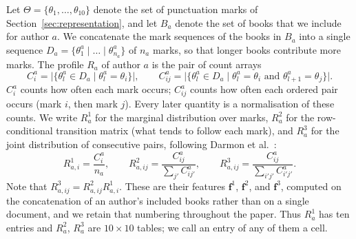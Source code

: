 \documentclass[11pt]{article}
\begin{document}
Let \(\Theta = \{\theta_1, \dots, \theta_{10}\}\) denote the set of
punctuation marks of Section~\ref{sec:representation}, and let \(B_a\)
denote the set of books that we include for author \(a\).  We concatenate
the mark sequences of the books in \(B_a\) into a single sequence
\(D_a = \{\theta^a_1 \mid \dots \mid \theta^a_{n_a}\}\) of \(n_a\) marks, so
that longer books contribute more marks.  The profile \(R_a\) of author
\(a\) is the pair of count arrays
\begin{equation}
  C^a_i = \big|\{\theta^a_l \in D_a \mid \theta^a_l = \theta_i\}\big|,
  \qquad
  C^a_{ij} = \big|\{\theta^a_l \in D_a \mid \theta^a_l = \theta_i
  \text{ and } \theta^a_{l+1} = \theta_j\}\big| .
  \label{eq:profile-counts}
\end{equation}
\(C^a_i\) counts how often each mark occurs; \(C^a_{ij}\) counts how often
each ordered pair occurs (mark \(i\), then mark \(j\)).  Every later
quantity is a normalisation of these counts.  We write \(R^1_a\) for the
marginal distribution over marks, \(R^2_a\) for the row-conditional
transition matrix (what tends to follow each mark), and \(R^3_a\) for the
joint distribution of consecutive pairs, following Darmon et al.\
\cite{darmon2021}:
\begin{equation}
  R^{1}_{a,i} = \frac{C^a_i}{n_a}, \qquad
  R^{2}_{a,ij} = \frac{C^a_{ij}}{\sum_{j'} C^a_{ij'}}, \qquad
  R^{3}_{a,ij} = \frac{C^a_{ij}}{\sum_{i'j'} C^a_{i'j'}} .
  \label{eq:profile-norms}
\end{equation}
Note that \(R^{3}_{a,ij} = R^{2}_{a,ij} R^{1}_{a,i}\).  These are their
features \(\boldsymbol{f}^{1}\), \(\boldsymbol{f}^{2}\), and \(\boldsymbol{f}^{3}\),
computed on the concatenation of an author's included books rather than on a
single document, and we retain that numbering throughout the paper.
Thus \(R^1_a\) has ten entries and \(R^2_a\), \(R^3_a\) are
\(10\times 10\) tables; we call an entry of any of them a cell.
\end{document}
